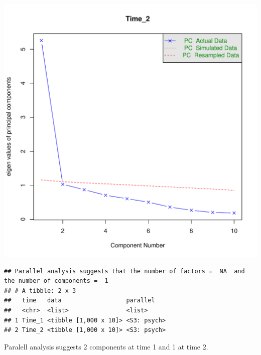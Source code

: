 \documentclass{article}\usepackage[]{graphicx}\usepackage[]{color}
\makeatletter
\def\maxwidth{ %
  \ifdim\Gin@nat@width>\linewidth
    \linewidth
  \else
    \Gin@nat@width
  \fi
}
\newenvironment{kframe}{%
 \def\at@end@of@kframe{}%
 \ifinner\ifhmode%
  \def\at@end@of@kframe{\end{minipage}}%
  \begin{minipage}{\columnwidth}%
 \fi\fi%
 \def\FrameCommand##1{\hskip\@totalleftmargin \hskip-\fboxsep
 \colorbox{shadecolor}{##1}\hskip-\fboxsep
     \hskip-\linewidth \hskip-\@totalleftmargin \hskip\columnwidth}%
 \MakeFramed {\advance\hsize-\width
   \@totalleftmargin\z@ \linewidth\hsize
   \@setminipage}}%
 {\par\unskip\endMakeFramed%
 \at@end@of@kframe}
\newenvironment{knitrout}{}{} %
\makeatother
\begin{document}
\begin{knitrout}
\includegraphics[width=\maxwidth]{figure/unnamed-chunk-5-2} 
\begin{kframe}\begin{verbatim}
## Parallel analysis suggests that the number of factors =  NA  and the number of components =  1
## # A tibble: 2 x 3
##   time   data                  parallel   
##   <chr>  <list>                <list>     
## 1 Time_1 <tibble [1,000 x 10]> <S3: psych>
## 2 Time_2 <tibble [1,000 x 10]> <S3: psych>
\end{verbatim}
\end{kframe}
\end{knitrout}

Paralell analysis suggests 2 components at time 1 and 1 at time 2.
\end{document}
